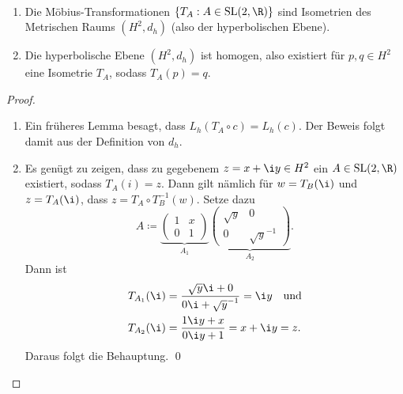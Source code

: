 \begin{theorem}
  \
  \begin{enumerate}
    \item Die Möbius-Transformationen \( \left \{ T_A : A \in \text{SL}(2,\R) \right \} \) sind Isometrien des Metrischen Raums \( (H^2, d_h) \) (also der hyperbolischen Ebene).
    \item Die hyperbolische Ebene \( (H^2, d_h) \) ist homogen, also existiert für \( p,q \in H^2 \) eine Isometrie \( T_A \), sodass \( T_A(p) = q \).
  \end{enumerate}

  \begin{proof}
    \
    \begin{enumerate}
      \item Ein früheres Lemma besagt, dass \( L_h(T_A \circ c) = L_h(c) \). Der Beweis folgt damit aus der Definition von \( d_h \).

      \item Es genügt zu zeigen, dass zu gegebenem \( z = x + \i y \in H^2 \) ein \( A \in \text{SL}(2,\R) \) existiert, sodass \( T_A(i) = z \). Dann gilt nämlich für \( w = T_B(\i) \) und \( z = T_A(\i) \), dass \( z = T_A \circ T_B^{-1}(w) \). Setze dazu
      \begin{equation*}
        A \coloneqq \underbrace{\begin{pmatrix}
          1 & x \\ 0 & 1
        \end{pmatrix}}_{A_1}\underbrace{\begin{pmatrix}
          \sqrt{y} & 0 \\ 0 & \sqrt{y}^{-1}
        \end{pmatrix}}_{A_2}\text{.}
      \end{equation*}
      Dann ist
      \begin{align*}
        T_{A_1}(\i) &= \frac{\sqrt{y}\i + 0}{0\i + \sqrt{y}^{-1}} = \i y \quad \text{und} \\
        T_{A_2}(\i) &= \frac{1\i y + x}{0\i y + 1} = x + \i y = z\text{.}
      \end{align*}
      Daraus folgt die Behauptung. \qed{}
    \end{enumerate}
  \end{proof}
\end{theorem}

